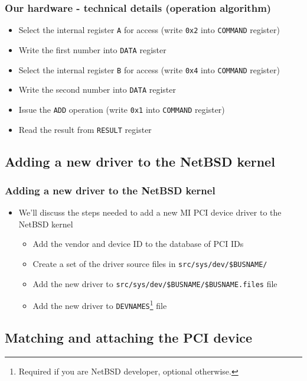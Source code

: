 \documentclass[dvipsnames,table]{beamer}
\begin{document}
\begin{frame}
\frametitle{Our hardware - technical details (operation algorithm)}
\begin{itemize}
	\item Select the internal register {\tt A} for access (write {\tt 0x2} into {\tt COMMAND} register)
	\item Write the first number into {\tt DATA} register
	\item Select the internal register {\tt B} for access (write {\tt 0x4} into {\tt COMMAND} register)
	\item Write the second number into {\tt DATA} register
	\item Issue the {\tt ADD} operation (write {\tt 0x1} into {\tt COMMAND} register)
	\item Read the result from {\tt RESULT} register

\end{itemize}
\end{frame}

\subsection{Adding a new driver to the NetBSD kernel}

\begin{frame}
\frametitle{Adding a new driver to the NetBSD kernel}
\begin{itemize}
	\item We'll discuss the steps needed to add a new MI PCI device driver to the NetBSD kernel
	\begin{itemize}
		\item Add the vendor and device ID to the database of PCI IDs
		\item Create a set of the driver source files in {\tt src/sys/dev/\$BUSNAME/ }
		\item Add the new driver to {\tt src/sys/dev/\$BUSNAME/\$BUSNAME.files} file
		\item Add the new driver to {\tt DEVNAMES}\footnote{Required if you are NetBSD developer, optional otherwise.} file
	\end{itemize}
\end{itemize}
\end{frame}

\subsection{Matching and attaching the PCI device}
\end{document}
